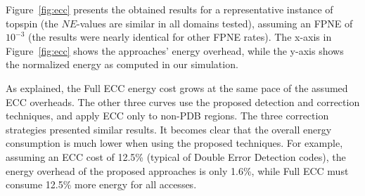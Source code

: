 \documentclass[letterpaper]{article}
\begin{document}

Figure~\ref{fig:ecc} presents the obtained results for a representative instance of topspin (the $NE$-values are similar in all domains tested), assuming an FPNE of $10^{-3}$ (the results were nearly identical for other FPNE rates). The x-axis in Figure~\ref{fig:ecc} shows the approaches' energy overhead, while the y-axis shows the normalized energy as computed in our simulation. 

As explained, the Full ECC energy cost grows at the same pace of the assumed ECC overheads. The other three curves use the proposed detection and correction techniques, and apply ECC only to non-PDB regions. The three correction strategies presented similar results.  It becomes clear that the overall energy consumption is much lower when using the proposed techniques. For example, assuming an ECC cost of 12.5\% (typical of Double Error Detection codes), the energy overhead of the proposed approaches is only 1.6\%, while Full ECC must consume 12.5\% more energy for all accesses. 







\end{document}
